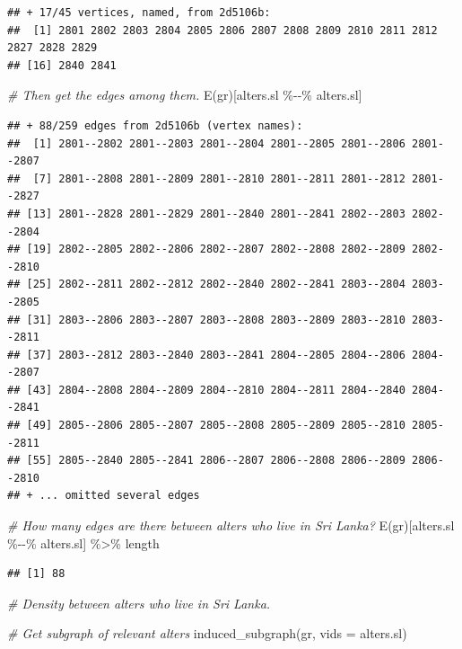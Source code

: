 \documentclass[
]{book}
\newenvironment{Shaded}{\begin{snugshade}}{\end{snugshade}}
\newcommand{\AttributeTok}[1]{\textcolor[rgb]{0.77,0.63,0.00}{#1}}
\newcommand{\CommentTok}[1]{\textcolor[rgb]{0.56,0.35,0.01}{\textit{#1}}}
\newcommand{\FunctionTok}[1]{\textcolor[rgb]{0.00,0.00,0.00}{#1}}
\newcommand{\NormalTok}[1]{#1}
\newcommand{\SpecialCharTok}[1]{\textcolor[rgb]{0.00,0.00,0.00}{#1}}
\begin{document}
\begin{verbatim}
## + 17/45 vertices, named, from 2d5106b:
##  [1] 2801 2802 2803 2804 2805 2806 2807 2808 2809 2810 2811 2812 2827 2828 2829
## [16] 2840 2841
\end{verbatim}

\begin{Shaded}
\begin{Highlighting}[]
\CommentTok{\# Then get the edges among them.}
\FunctionTok{E}\NormalTok{(gr)[alters.sl }\SpecialCharTok{\%{-}{-}\%}\NormalTok{ alters.sl]}
\end{Highlighting}
\end{Shaded}

\begin{verbatim}
## + 88/259 edges from 2d5106b (vertex names):
##  [1] 2801--2802 2801--2803 2801--2804 2801--2805 2801--2806 2801--2807
##  [7] 2801--2808 2801--2809 2801--2810 2801--2811 2801--2812 2801--2827
## [13] 2801--2828 2801--2829 2801--2840 2801--2841 2802--2803 2802--2804
## [19] 2802--2805 2802--2806 2802--2807 2802--2808 2802--2809 2802--2810
## [25] 2802--2811 2802--2812 2802--2840 2802--2841 2803--2804 2803--2805
## [31] 2803--2806 2803--2807 2803--2808 2803--2809 2803--2810 2803--2811
## [37] 2803--2812 2803--2840 2803--2841 2804--2805 2804--2806 2804--2807
## [43] 2804--2808 2804--2809 2804--2810 2804--2811 2804--2840 2804--2841
## [49] 2805--2806 2805--2807 2805--2808 2805--2809 2805--2810 2805--2811
## [55] 2805--2840 2805--2841 2806--2807 2806--2808 2806--2809 2806--2810
## + ... omitted several edges
\end{verbatim}

\begin{Shaded}
\begin{Highlighting}[]
\CommentTok{\# How many edges are there between alters who live in Sri Lanka?}
\FunctionTok{E}\NormalTok{(gr)[alters.sl }\SpecialCharTok{\%{-}{-}\%}\NormalTok{ alters.sl] }\SpecialCharTok{\%\textgreater{}\%} 
\NormalTok{  length}
\end{Highlighting}
\end{Shaded}

\begin{verbatim}
## [1] 88
\end{verbatim}

\begin{Shaded}
\begin{Highlighting}[]
\CommentTok{\# Density between alters who live in Sri Lanka.}

\CommentTok{\# Get subgraph of relevant alters}
\FunctionTok{induced\_subgraph}\NormalTok{(gr, }\AttributeTok{vids =}\NormalTok{ alters.sl)}
\end{Highlighting}
\end{Shaded}
\end{document}
